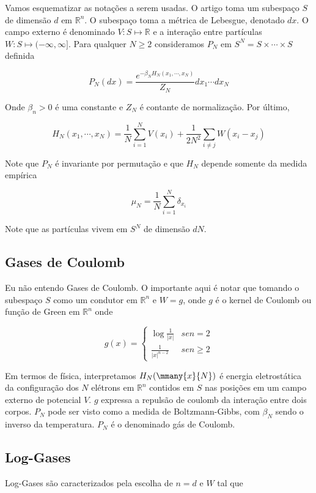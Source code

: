 Vamos esquematizar as notações a serem usadas. O artigo toma um subespaço $S$ de dimensão $d$ em $\mathbb{R}^n$. O subespaço toma a métrica de Lebesgue, denotado $dx$. O campo externo é denominado $V : S \mapsto \mathbb{R}$ e a interação entre partículas $W : S \mapsto (-\infty, \infty]$. Para qualquer $N \geq 2$ consideramos $P_N$ em $S^N = S \times \cdots \times S$ definida

\[
	P_N(dx) = \frac{e^{-\beta_N H_N(x_1,\cdots,x_N)}}{Z_N} dx_1 \cdots dx_N
\]

Onde $\beta_n > 0$ é uma constante e $Z_N$ é contante de normalização. Por último,

\[
	H_N(x_1, \cdots, x_N) = \frac{1}{N} \sum_{i=1}^{N} V(x_i) + \frac{1}{2N^2} \sum_{i\neq j} W(x_i - x_j)
\]

Note que $P_N$ é invariante por permutação e que $H_N$ depende somente da medida empírica

\[
	\mu_N = \frac{1}{N} \sum_{i=1}^{N} \delta_{x_i}
\]

Note que as partículas vivem em $S^N$ de dimensão $dN$.

\subsection{Gases de Coulomb}

Eu não entendo Gases de Coulomb. O importante aqui é notar que tomando o subespaço $S$ como um condutor em $\mathbb{R}^n$ e $W = g$, onde $g$ é o kernel de Coulomb ou função de Green em $\mathbb{R}^n$ onde

\[
	g(x) = 
	\begin{cases}
		\log \frac{1}{|x|} & se n = 2 \\
		\frac{1}{|x|^{n-2}} & se n \geq 2
	\end{cases}
\]

Em termos de física, interpretamos $H_N(\mmany{x}{N})$ é energia eletrostática da configuração dos $N$ elétrons em $\mathbb{R}^n$ contidos em $S$ nas posições  em um campo externo de potencial $V$. $g$ expressa a repulsão de coulomb da interação entre dois corpos. $P_N$ pode ser visto como a medida de Boltzmann-Gibbs, com $\beta_N$ sendo o inverso da temperatura. $P_N$ é o denominado gás de Coulomb.

\subsection{Log-Gases}

Log-Gases são caracterizados pela escolha de $n=d$ e $W$ tal que

